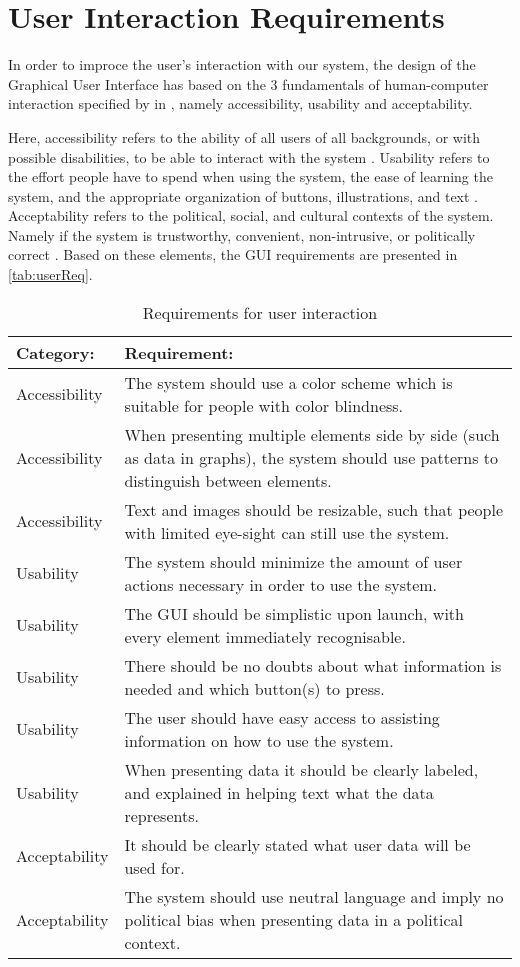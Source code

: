 \section{User Interaction Requirements}
In order to improce the user's interaction with our system, the design of the
Graphical User Interface has based on the 3 fundamentals of human-computer
interaction specified by \citeauthor{benyon2013designing} in
\citep[ch.4]{benyon2013designing}, namely accessibility, usability and
acceptability. 

Here, accessibility refers to the ability of all users of all backgrounds, or
with possible disabilities, to be able to interact with the system
\citep[p.77-80]{benyon2013designing}.
Usability refers to the effort people have to spend when using the system, the
ease of learning the system, and the appropriate organization of buttons,
illustrations, and text \citep[p.81-84]{benyon2013designing}. Acceptability
refers to the political, social, and cultural contexts of the system. Namely if
the system is trustworthy, convenient, non-intrusive, or politically correct
\citep[p.84-85]{benyon2013designing}. Based on these elements, the GUI
requirements are presented in \autoref{tab:userReq}.

\begin{table}[H]\centering
\begin{tabular}{|l|p{11cm}|}\hline
\textbf{Category:} & \textbf{Requirement:} \\\hline 
Accessibility  & The system should use a color scheme which is suitable for
people with color blindness.\\\hline 
Accessibility  & When presenting multiple elements side by side (such as data
in graphs), the system should use patterns to distinguish between
elements.\\\hline
Accessibility & Text and images should be resizable, such that people with
limited eye-sight can still use the system.\\\hline
Usability & The system should minimize the amount of user actions necessary in
order to use the system. \\\hline
Usability & The \ac{GUI} should be simplistic upon launch, with every element
immediately recognisable. \\\hline
Usability & There should be no doubts about what information is needed and which
button(s) to press. \\\hline
Usability & The user should have easy access to assisting information on how to
use the system. \\\hline
Usability & When presenting data it should be clearly labeled, and explained in
helping text what the data represents.\\\hline
Acceptability & It should be clearly stated what user data will be used for.\\\hline
Acceptability & The system should use neutral language and imply no political
bias when presenting data in a political context.\\\hline
\end{tabular}
\caption{Requirements for user interaction}
\label{tab:userReq}
\end{table}